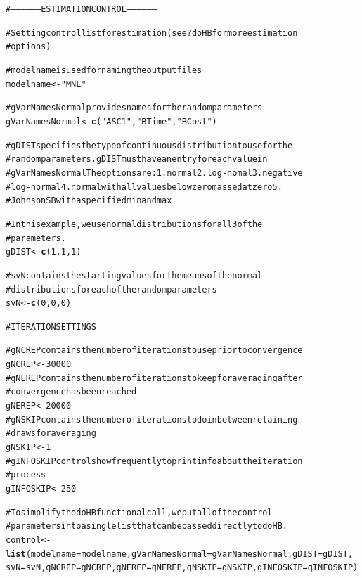\documentclass{article}\usepackage{graphicx, color}
\makeatletter
\newcommand{\hlfunctioncall}[1]{\textcolor[rgb]{0.501960784313725,0,0.329411764705882}{\textbf{#1}}}%
\newcommand{\hlstring}[1]{\textcolor[rgb]{0.6,0.6,1}{#1}}%
\newcommand{\hlcomment}[1]{\textcolor[rgb]{0.180392156862745,0.6,0.341176470588235}{#1}}%
\newenvironment{kframe}{%
 \def\at@end@of@kframe{}%
 \ifinner\ifhmode%
  \def\at@end@of@kframe{\end{minipage}}%
  \begin{minipage}{\columnwidth}%
 \fi\fi%
 \def\FrameCommand##1{\hskip\@totalleftmargin \hskip-\fboxsep
 \colorbox{shadecolor}{##1}\hskip-\fboxsep
     \hskip-\linewidth \hskip-\@totalleftmargin \hskip\columnwidth}%
 \MakeFramed {\advance\hsize-\width
   \@totalleftmargin\z@ \linewidth\hsize
   \@setminipage}}%
 {\par\unskip\endMakeFramed%
 \at@end@of@kframe}
\newenvironment{knitrout}{}{} %
\makeatother
\begin{document}
\begin{knitrout}
\color{fgcolor}\begin{kframe}
\begin{alltt}

\hlcomment{# ------------------ ESTIMATION CONTROL ------------------}

\hlcomment{# Setting control list for estimation (see ?doHB for more estimation}
\hlcomment{# options)}

\hlcomment{# modelname is used for naming the output files}
modelname <- \hlstring{"MNL"}

\hlcomment{# gVarNamesNormal provides names for the random parameters}
gVarNamesNormal <- \hlfunctioncall{c}(\hlstring{"ASC1"}, \hlstring{"BTime"}, \hlstring{"BCost"})

\hlcomment{# gDIST specifies the type of continuous distribution to use for the}
\hlcomment{# random parameters. gDIST must have an entry for each value in}
\hlcomment{# gVarNamesNormal The options are: 1. normal 2. log-nomal 3. negative}
\hlcomment{# log-normal 4. normal with all values below zero massed at zero 5.}
\hlcomment{# Johnson SB with a specified min and max}

\hlcomment{# In this example, we use normal distributions for all 3 of the}
\hlcomment{# parameters.}
gDIST <- \hlfunctioncall{c}(1, 1, 1)

\hlcomment{# svN contains the starting values for the means of the normal}
\hlcomment{# distributions for each of the random parameters}
svN <- \hlfunctioncall{c}(0, 0, 0)

\hlcomment{# ITERATION SETTINGS}

\hlcomment{# gNCREP contains the number of iterations to use prior to convergence}
gNCREP <- 30000
\hlcomment{# gNEREP contains the number of iterations to keep for averaging after}
\hlcomment{# convergence has been reached}
gNEREP <- 20000
\hlcomment{# gNSKIP contains the number of iterations to do in between retaining}
\hlcomment{# draws for averaging}
gNSKIP <- 1
\hlcomment{# gINFOSKIP controls how frequently to print info about the iteration}
\hlcomment{# process}
gINFOSKIP <- 250

\hlcomment{# To simplify the doHB functional call, we put all of the control}
\hlcomment{# parameters into a single list that can be passed directly to doHB.}
control <- \hlfunctioncall{list}(modelname = modelname, gVarNamesNormal = gVarNamesNormal, gDIST = gDIST, 
    svN = svN, gNCREP = gNCREP, gNEREP = gNEREP, gNSKIP = gNSKIP, gINFOSKIP = gINFOSKIP)

\end{alltt}
\end{kframe}
\end{knitrout}
\end{document}
